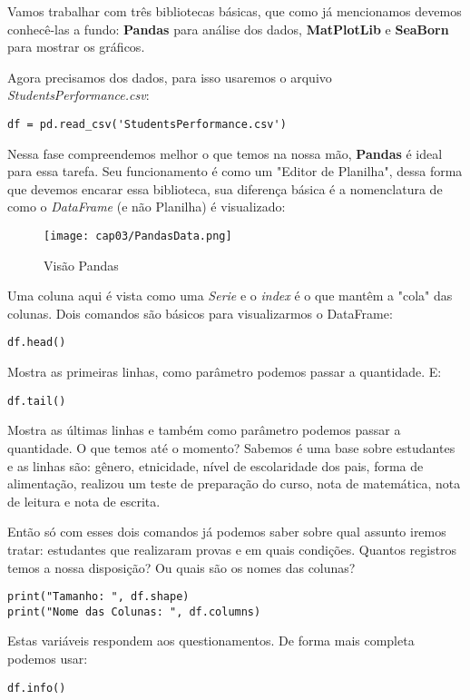 Vamos trabalhar com três bibliotecas básicas, que como já mencionamos devemos conhecê-las a fundo: \textbf{Pandas} para análise dos dados, \textbf{MatPlotLib} e \textbf{SeaBorn} para mostrar os gráficos.

Agora precisamos dos dados, para isso usaremos o arquivo \textit{StudentsPerformance.csv}:
\begin{lstlisting}
df = pd.read_csv('StudentsPerformance.csv')
\end{lstlisting}

Nessa fase compreendemos melhor o que temos na nossa mão, \textbf{Pandas} é ideal para essa tarefa. Seu funcionamento é como um "Editor de Planilha", dessa forma que devemos encarar essa biblioteca, sua diferença básica é a nomenclatura de como o \textit{DataFrame} (e não Planilha) é visualizado:
\begin{figure}[H]
	\centering
	\texttt{[image: cap03/PandasData.png]}
	\caption{Visão Pandas}
\end{figure}

Uma coluna aqui é vista como uma \textit{Serie} e o \textit{index} é o que mantêm a "cola" das colunas. Dois comandos são básicos para visualizarmos o DataFrame:
\begin{lstlisting}
df.head()
\end{lstlisting}

Mostra as primeiras linhas, como parâmetro podemos passar a quantidade. E:
\begin{lstlisting}
df.tail()
\end{lstlisting}

Mostra as últimas linhas e também como parâmetro podemos passar a quantidade. O que temos até o momento? Sabemos é uma base sobre estudantes e as linhas são: gênero, etnicidade, nível de escolaridade dos pais, forma de alimentação, realizou um teste de preparação do curso, nota de matemática, nota de leitura e nota de escrita.

Então só com esses dois comandos já podemos saber sobre qual assunto iremos tratar: estudantes que realizaram provas e em quais condições. Quantos registros temos a nossa disposição? Ou quais são os nomes das colunas?
\begin{lstlisting}
print("Tamanho: ", df.shape)
print("Nome das Colunas: ", df.columns)
\end{lstlisting}

Estas variáveis respondem aos questionamentos. De forma mais completa podemos usar:
\begin{lstlisting}
df.info()
\end{lstlisting}


